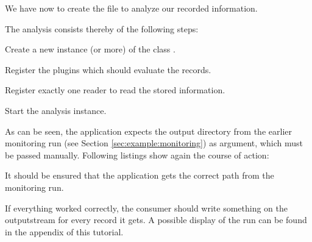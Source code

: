 We have now to create the file  to analyze our recorded information. 

The analysis consists thereby of the following steps:
\begin{compactenum}
\item Create a new instance (or more) of the class .
\item Register the plugins which should evaluate the records.
\item Register exactly one reader to read the stored information.
\item Start the analysis instance.
\end{compactenum}

\setJavaCodeListing       

As can be seen, the application expects the output directory from the earlier monitoring run (see Section \ref{sec:example:monitoring}) as argument, which must be passed manually. Following listings show again the course of action:
\setBashListing 		
	
	
It should be ensured that the application gets the correct path from the monitoring run. 

If everything worked correctly, the consumer should write something on the outputstream for every record it gets. A possible display of the run can be found in the appendix of this tutorial. 